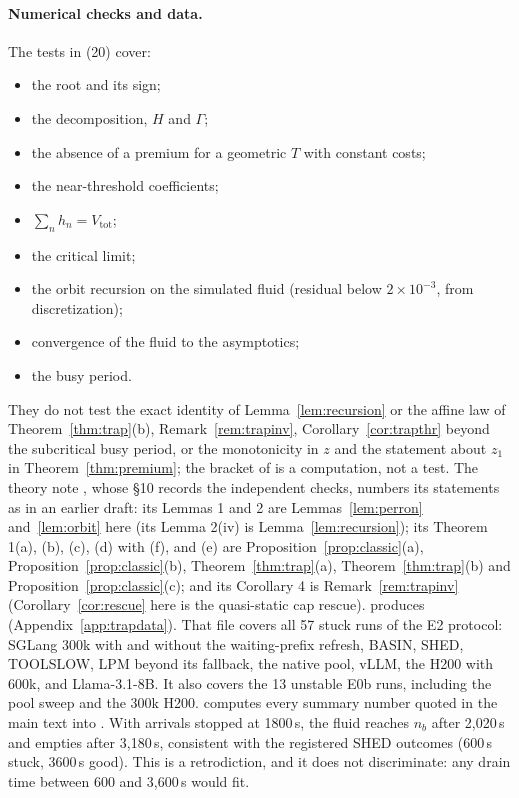 \paragraph{Numerical checks and data.} The tests in  (20) cover:
\begin{itemize}[leftmargin=*,nosep]
\item the root and its sign;
\item the decomposition, $H$ and $\Gamma$;
\item the absence of a premium for a geometric $T$ with constant costs;
\item the near-threshold coefficients;
\item $\sum_nh_n=V_{\mathrm{tot}}$;
\item the critical limit;
\item the orbit recursion on the simulated fluid (residual below $2\times10^{-3}$, from discretization);
\item convergence of the fluid to the asymptotics;
\item the busy period.
\end{itemize}
They do not test the exact identity of Lemma~\ref{lem:recursion} or the affine law of Theorem~\ref{thm:trap}(b),
Remark~\ref{rem:trapinv}, Corollary~\ref{cor:trapthr} beyond the subcritical busy period, or the monotonicity in $z$ and the
statement about $z_1$ in Theorem~\ref{thm:premium}; the bracket of  is a computation, not a test. The theory
note , whose \S10 records the independent checks, numbers its statements as in an earlier
draft: its Lemmas 1 and 2 are Lemmas~\ref{lem:perron} and~\ref{lem:orbit} here (its Lemma 2(iv) is
Lemma~\ref{lem:recursion}); its Theorem 1(a), (b), (c), (d) with (f), and (e) are Proposition~\ref{prop:classic}(a),
Proposition~\ref{prop:classic}(b), Theorem~\ref{thm:trap}(a), Theorem~\ref{thm:trap}(b) and Proposition~\ref{prop:classic}(c);
and its Corollary 4 is Remark~\ref{rem:trapinv} (Corollary~\ref{cor:rescue} here is the quasi-static cap rescue).
 produces 
(Appendix~\ref{app:trapdata}). That file covers all 57 stuck runs of the E2 protocol: SGLang 300k with and without the waiting-prefix refresh, BASIN, SHED, TOOLSLOW, LPM beyond its
fallback, the native pool, vLLM, the H200 with 600k, and Llama-3.1-8B. It also covers the 13 unstable E0b runs, including the
pool sweep and the 300k H200.  computes every summary number quoted in the main text
into . With arrivals stopped at 1800\,s, the fluid reaches $n_b$ after 2{,}020\,s and
empties after 3{,}180\,s, consistent with the registered SHED outcomes (600\,s stuck, 3600\,s good). This is a retrodiction,
and it does not discriminate: any drain time between 600 and 3{,}600\,s would fit.

